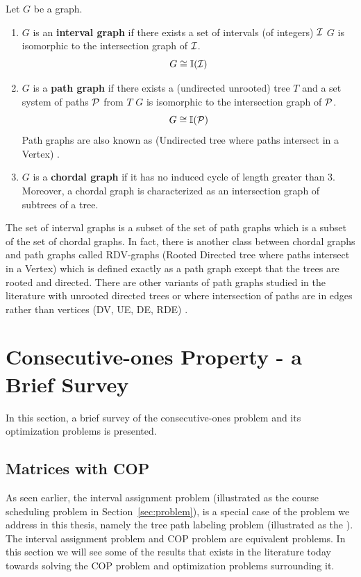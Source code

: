 \begin{definition}
  \label{def:pathgraph}
  Let $G$ be a graph.
  \begin{enumerate}
  \hangindent {}
\item $G$ is an \textbf{interval graph} if there exists a set of
  intervals (of integers) ${\cal I}$ \stt $G$ is isomorphic to the intersection graph of
  ${\cal I}$. \[G \cong \mathbb I({\cal I})\]
  \item $G$ is a \textbf{path graph} if there exists a (undirected
    unrooted) tree $T$ and a set system of paths ${\cal P}$ from $T$ \stt $G$ is
    isomorphic to the intersection graph of ${\cal P}$. \[G \cong
    \mathbb I({\cal P})\] Path graphs are also known as \uvgraphs (Undirected
    tree where paths intersect in a Vertex) \cite{mw86}.
  \item $G$ is a \textbf{chordal graph} if it has no induced cycle of
    length greater than 3. Moreover, a chordal graph is characterized
    as an intersection graph of subtrees of a tree.
  \end{enumerate}
\end{definition}

The set of interval graphs is a subset of the set of path graphs which
is a subset of the set of chordal graphs. In fact, there is another
class between chordal graphs and path graphs called RDV-graphs (Rooted
Directed tree where paths intersect in a Vertex) \cite{mw86} which is
defined exactly as a path graph except that the trees are rooted and
directed. There are other variants of path graphs studied in the
literature with unrooted directed trees or where intersection of paths
are in edges rather than vertices (DV, UE, DE, RDE) \cite{gm03}.


\section[Brief Survey]{Consecutive-ones Property - a Brief Survey}
\label{sec:background}

In this section, a brief survey of the consecutive-ones problem and
its optimization problems is presented.


\subsection{Matrices with COP}
\label{sec:copmatrices}
As seen earlier, the interval assignment problem (illustrated as the
course scheduling problem in Section~\ref{sec:problem}), is a special
case of the problem we address in this thesis, namely the tree path
labeling problem (illustrated as the \illustrationproblem). The
interval assignment problem and COP problem are equivalent
problems. In this section we will see some of the results that exists
in the literature today towards solving the COP problem and
optimization problems surrounding it.


